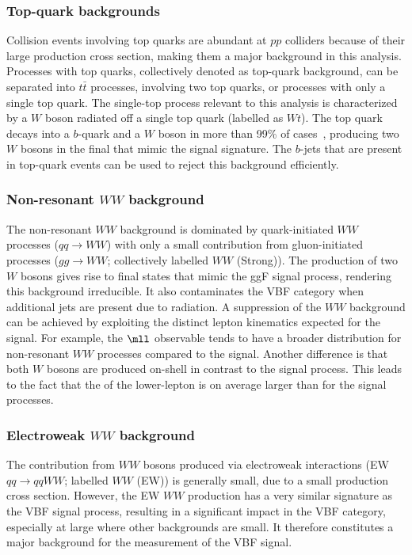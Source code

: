 \subsubsection{Top-quark backgrounds}
Collision events involving top quarks are abundant at $pp$ colliders because of their large production cross section, making them a major background in this analysis.
Processes with top quarks, collectively denoted as top-quark background, can be separated into $t\bar{t}$ processes, involving two top quarks, or processes with only a single top quark. 
The single-top process relevant to this analysis is characterized by a $W$ boson radiated off a single top quark (labelled as $Wt$). 
The top quark decays into a $b$-quark and a $W$ boson in more than 99\% of cases~\cite{PDG2020}, producing two $W$ bosons in the final that mimic the signal signature. 
The $b$-jets that are present in top-quark events can be used to reject this background efficiently.

\subsubsection{Non-resonant $WW$ background}
The non-resonant $WW$ background is dominated by quark-initiated $WW$ processes ($qq \to WW$) with only a small contribution from gluon-initiated processes ($gg \to WW$; collectively labelled $WW$ (Strong)).
The production of two $W$ bosons gives rise to final states that mimic the ggF signal process, rendering this background irreducible. 
It also contaminates the VBF \TwoJet category when additional jets are present due to radiation. 
A suppression of the $WW$ background can be achieved by exploiting the distinct lepton kinematics expected for the signal. For example, the $\mll$ observable tends to have a broader distribution for non-resonant $WW$ processes compared to the signal. 
Another difference is that both $W$ bosons are produced on-shell in contrast to the signal process. 
This leads to the fact that the \pT of the lower-\pT lepton is on average larger than for the signal processes. 

\subsubsection{Electroweak $WW$ background}
The contribution from $WW$ bosons produced via electroweak interactions (EW $qq \to qqWW$; labelled $WW$ (EW)) is generally small, due to a small production cross section. However, the EW $WW$ production has a very similar signature as the VBF signal process, resulting in a significant impact in the VBF category, especially at large \mjj where other backgrounds are small. 
It therefore constitutes a major background for the measurement of the VBF signal. 

